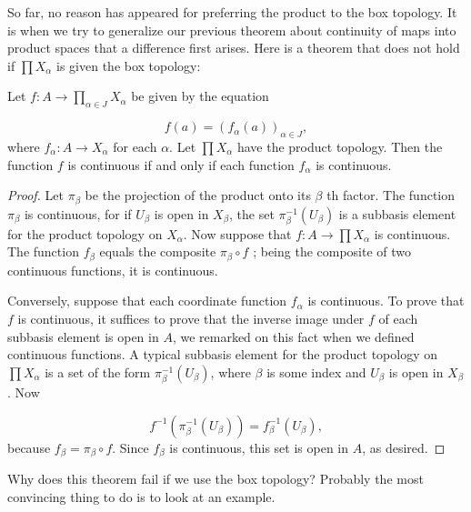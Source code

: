 So far, no reason has appeared for preferring the product to the box topology. It is when we try to generalize our previous theorem about continuity of maps into product spaces that a difference first arises. Here is a theorem that does not hold if \(\prod {X}_{\alpha }\) is given the box topology:

\begin{theorem}
\label{thm:\thetheorem}
 Let \(f : A \rightarrow \mathop{\prod }\limits_{{\alpha \in J}}X_{\alpha }\) be given by the equation

 \[
 f( a) = {( f_{\alpha }( a) ) }_{\alpha \in J},
 \]
 where \(f_{\alpha } : A \rightarrow {X}_{\alpha }\) for each \(\alpha\). Let \(\prod {X}_{\alpha }\) have the product topology. Then the function \(f\) is continuous if and only if each function \(f_{\alpha }\) is continuous.
\end{theorem}

\begin{proof}
 Let \({\pi }_{\beta }\) be the projection of the product onto its \(\beta\) th factor. The function \({\pi }_{\beta }\) is continuous, for if \(U_{\beta }\) is open in \(X_{\beta }\), the set \({\pi }_{\beta }^{-1}( U_{\beta })\) is a subbasis element for the product topology on \(X_{\alpha }\). Now suppose that \(f : A \rightarrow \prod {X}_{\alpha }\) is continuous. The function \(f_{\beta }\) equals the composite \({\pi }_{\beta } \circ f\) ; being the composite of two continuous functions, it is continuous.

 Conversely, suppose that each coordinate function \(f_{\alpha }\) is continuous. To prove that \(f\) is continuous, it suffices to prove that the inverse image under \(f\) of each subbasis element is open in \(A\), we remarked on this fact when we defined continuous functions. A typical subbasis element for the product topology on \(\prod {X}_{\alpha }\) is a set of the form \({\pi }_{\beta }^{-1}( U_{\beta })\), where \(\beta\) is some index and \(U_{\beta }\) is open in \(X_{\beta }\). Now

 \[
 f^{-1}( {{\pi }_{\beta }^{-1}( U_{\beta }) }) = f_{\beta }^{-1}( U_{\beta }),
 \]
 because \(f_{\beta } = {\pi }_{\beta } \circ f\). Since \(f_{\beta }\) is continuous, this set is open in \(A\), as desired.
\end{proof}

Why does this theorem fail if we use the box topology? Probably the most convincing thing to do is to look at an example.

